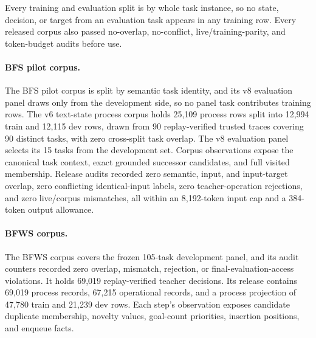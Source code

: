 Every training and evaluation split is by whole task instance, so no state, decision, or target from an evaluation task appears in any training row. Every released corpus also passed no-overlap, no-conflict, live/training-parity, and token-budget audits before use.

\paragraph{BFS pilot corpus.}
The BFS pilot corpus is split by semantic task identity, and its v8 evaluation panel draws only from the development side, so no panel task contributes training rows. The v6 text-state process corpus holds 25,109 process rows split into 12,994 train and 12,115 dev rows, drawn from 90 replay-verified trusted traces covering 90 distinct tasks, with zero cross-split task overlap. The v8 evaluation panel selects its 15 tasks from the development set. Corpus observations expose the canonical task context, exact grounded successor candidates, and full visited membership. Release audits recorded zero semantic, input, and input-target overlap, zero conflicting identical-input labels, zero teacher-operation rejections, and zero live/corpus mismatches, all within an 8,192-token input cap and a 384-token output allowance.

\paragraph{BFWS corpus.}
The BFWS corpus covers the frozen 105-task development panel, and its audit counters recorded zero overlap, mismatch, rejection, or final-evaluation-access violations. It holds 69,019 replay-verified teacher decisions. Its release contains 69,019 process records, 67,215 operational records, and a process projection of 47,780 train and 21,239 dev rows. Each step's observation exposes candidate duplicate membership, novelty values, goal-count priorities, insertion positions, and enqueue facts.

